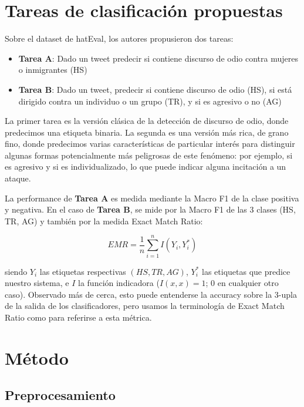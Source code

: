 \section{Tareas de clasificación propuestas}

Sobre el dataset de hatEval, los autores propusieron dos tareas:

\newcommand{\subtaska}[0]{\textbf{Tarea A}}
\newcommand{\subtaskb}[0]{\textbf{Tarea B}}

\begin{itemize}
    \item \subtaska{}: Dado un tweet predecir si contiene discurso de odio contra mujeres o inmigrantes (HS)
    \item \subtaskb{}: Dado un tweet, predecir si contiene discurso de odio (HS), si está dirigido contra un individuo o un grupo (TR), y si es agresivo o no (AG)
\end{itemize}


La primer tarea es la versión clásica de la detección de discurso de odio, donde predecimos una etiqueta binaria. La segunda es una versión más rica, de grano fino, donde predecimos varias características de particular interés para distinguir algunas formas potencialmente más peligrosas de este fenómeno: por ejemplo, si es agresivo y si es individualizado, lo que puede indicar alguna incitación a un ataque.

La performance de \subtaska{} es medida mediante la Macro F1 de la clase positiva y negativa. En el caso de \subtaskb{}, se mide por la Macro F1 de las 3 clases (HS, TR, AG) y también por la medida Exact Match Ratio:

\begin{equation*}
    EMR = \frac{1}{n} \sum\limits_{i=1}^{n} I(Y_i, Y_i^*)
\end{equation*}

siendo $Y_i$ las etiquetas respectivas $(HS, TR, AG)$, $Y_i^*$ las etiquetas que predice nuestro sistema, e  $I$ la función indicadora ($I(x, x) = 1$; $0$ en cualquier otro caso). Observado más de cerca, esto puede entenderse la accuracy sobre la 3-upla de la salida de los clasificadores, pero usamos la terminología de Exact Match Ratio como \citet{zhang-2014-multilabel} para referirse a esta métrica.

\section{Método}

\subsection{Preprocesamiento}
\label{sec:04_preprocessing}

